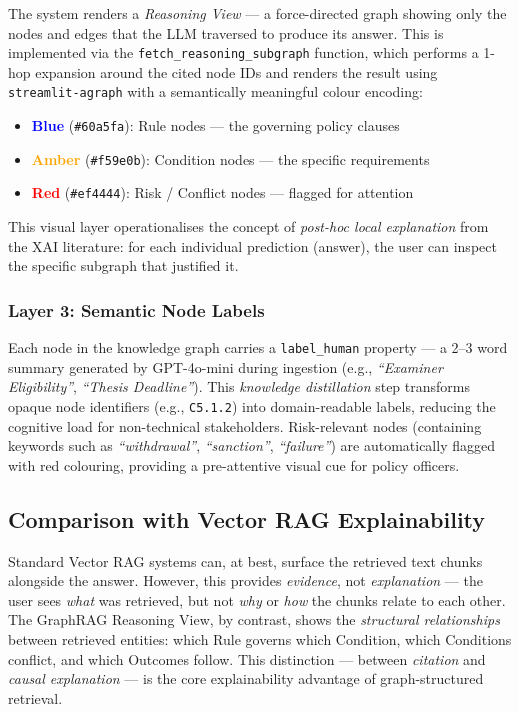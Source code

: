 The system renders a \textit{Reasoning View} — a force-directed graph showing only the nodes and edges that the LLM traversed to produce its answer. This is implemented via the \texttt{fetch\_reasoning\_subgraph} function, which performs a 1-hop expansion around the cited node IDs and renders the result using \texttt{streamlit-agraph} with a semantically meaningful colour encoding:

\begin{itemize}
    \item \textcolor{blue}{\textbf{Blue}} (\texttt{\#60a5fa}): Rule nodes — the governing policy clauses
    \item \textcolor{orange}{\textbf{Amber}} (\texttt{\#f59e0b}): Condition nodes — the specific requirements
    \item \textcolor{red}{\textbf{Red}} (\texttt{\#ef4444}): Risk / Conflict nodes — flagged for attention
\end{itemize}

This visual layer operationalises the concept of \textit{post-hoc local explanation} from the XAI literature: for each individual prediction (answer), the user can inspect the specific subgraph that justified it.

\subsubsection{Layer 3: Semantic Node Labels}

Each node in the knowledge graph carries a \texttt{label\_human} property — a 2--3 word summary generated by GPT-4o-mini during ingestion (e.g., \textit{``Examiner Eligibility''}, \textit{``Thesis Deadline''}). This \textit{knowledge distillation} step transforms opaque node identifiers (e.g., \texttt{C5.1.2}) into domain-readable labels, reducing the cognitive load for non-technical stakeholders. Risk-relevant nodes (containing keywords such as \textit{``withdrawal''}, \textit{``sanction''}, \textit{``failure''}) are automatically flagged with red colouring, providing a pre-attentive visual cue for policy officers.

\subsection{Comparison with Vector RAG Explainability}

Standard Vector RAG systems can, at best, surface the retrieved text chunks alongside the answer. However, this provides \textit{evidence}, not \textit{explanation} — the user sees \textit{what} was retrieved, but not \textit{why} or \textit{how} the chunks relate to each other. The GraphRAG Reasoning View, by contrast, shows the \textit{structural relationships} between retrieved entities: which Rule governs which Condition, which Conditions conflict, and which Outcomes follow. This distinction — between \textit{citation} and \textit{causal explanation} — is the core explainability advantage of graph-structured retrieval.


